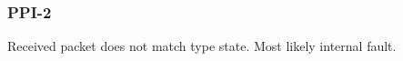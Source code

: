 \subsubsection{PPI-2}\label{sec:error_code_ppi_2}

Received packet does not match type state. Most likely internal fault.
